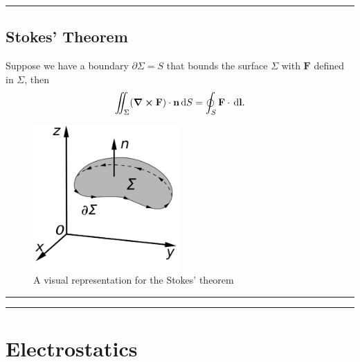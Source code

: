 \documentclass[12pt,english]{article}
\newcommand{\dmr}[1]{\, \mathrm{d}#1} %
\numberwithin{equation}{subsection}
\renewcommand{\vec}[1]{\mathbf{#1}}
\begin{document}
\par\noindent\rule{\textwidth}{0.4pt}

\subsection{Stokes' Theorem}
Suppose we have a boundary $\partial \Sigma = S$ that bounds the surface $\Sigma$ with $\vec{F}$ defined in $\Sigma$, then
\[
    \iint_{\Sigma} (\grad \cross \vec{F})\cdot\vec{n}\dmr{S} = \oint_{S} \vec{F}\cdot \dmr{\vec{l}}.
\] 
\begin{figure}[h]
    \centering
    \includegraphics[width =0.5\textwidth]{1200px-Stokes'_Theorem.svg.png}
    \caption{A visual representation for the Stokes' theorem\cite{noauthor_stokes_2021}}
\end{figure}

\par\noindent\rule{\textwidth}{0.4pt}
\par\noindent\rule{\textwidth}{0.4pt}
\section{Electrostatics}
\end{document}
